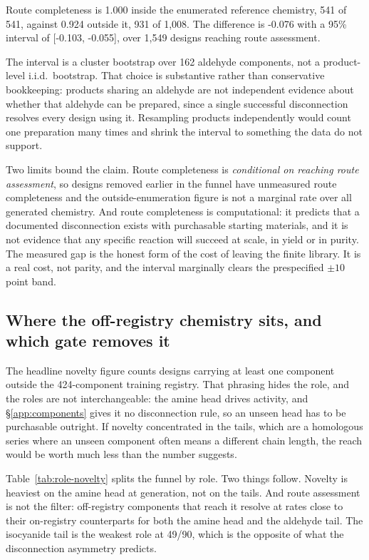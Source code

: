 \documentclass{article}
\newcommand{\RegistrySize}{424}
\newcommand{\ResolveOffIso}{49/90}
\newcommand{\RouteInside}{1.000}
\newcommand{\RouteOutside}{0.924}
\newcommand{\RouteDiff}{-0.076}
\newcommand{\RouteDiffCI}{[-0.103, -0.055]}
\newcommand{\RouteClusters}{162}
\begin{document}
Route completeness is \RouteInside{} inside the enumerated reference chemistry, 541 of 541, against
\RouteOutside{} outside it, 931 of 1,008. The difference is \RouteDiff{} with a 95\% interval of
\RouteDiffCI{}, over 1,549 designs reaching route assessment.

The interval is a cluster bootstrap over \RouteClusters{} aldehyde components, not a product-level
i.i.d.\ bootstrap. That choice is substantive rather than conservative bookkeeping: products sharing
an aldehyde are not independent evidence about whether that aldehyde can be prepared, since a single
successful disconnection resolves every design using it. Resampling products independently would
count one preparation many times and shrink the interval to something the data do not support.

Two limits bound the claim. Route completeness is \emph{conditional on reaching route assessment}, so
designs removed earlier in the funnel have unmeasured route completeness and the outside-enumeration
figure is not a marginal rate over all generated chemistry. And route completeness is computational:
it predicts that a documented disconnection exists with purchasable starting materials, and it is not
evidence that any specific reaction will succeed at scale, in yield or in purity. The measured gap is
the honest form of the cost of leaving the finite library. It is a real cost, not parity, and the
interval marginally clears the prespecified $\pm 10$ point band.

\subsection{Where the off-registry chemistry sits, and which gate removes it}
\label{app:role-novelty}
The headline novelty figure counts designs carrying at least one component outside the
\RegistrySize{}-component training registry. That phrasing hides the role, and the roles are not
interchangeable: the amine head drives activity, and \S\ref{app:components} gives it no
disconnection rule, so an unseen head has to be purchasable outright. If novelty concentrated in the
tails, which are a homologous series where an unseen component often means a different chain length,
the reach would be worth much less than the number suggests.

Table~\ref{tab:role-novelty} splits the funnel by role. Two things follow. Novelty is heaviest on the
amine head at generation, not on the tails. And route assessment is not the filter: off-registry
components that reach it resolve at rates close to their on-registry counterparts for both the amine
head and the aldehyde tail. The isocyanide tail is the weakest role at \ResolveOffIso{}, which is the
opposite of what the disconnection asymmetry predicts.
\end{document}
